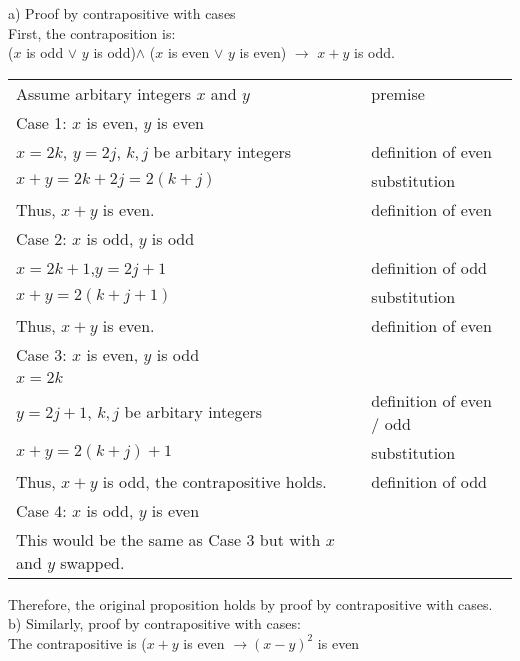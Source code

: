 \documentclass[12pt]{exam}
\begin{document}
\begin{solution}
  a) Proof by contrapositive with cases\\
  First, the contraposition is:\\
  ($x$ is odd $\lor$ $y$ is odd)$\land$ ($x$ is even $\lor$ $y$ is even) $\rightarrow$ $x+y$ is odd.\\
\begin{tabular}{ll}
  Assume arbitary integers $x$ and $y$ & premise\\
  Case 1: $x$ is even, $y$ is even\\
  $x=2k$, $y=2j$, $k,j$ be arbitary integers &definition of even\\
  $x+y=2k+2j=2(k+j)$ & substitution\\
  Thus, $x+y$ is even. & definition of even\\
  Case 2: $x$ is odd, $y$ is odd\\
  $x=2k+1$,$y=2j+1$ & definition of odd\\
  $x+y=2(k+j+1)$ & substitution\\
  Thus, $x+y$ is even. & definition of even\\
  Case 3: $x$ is even, $y$ is odd\\
  $x=2k$\\
  $y=2j+1$, $k,j$ be arbitary integers &definition of even / odd\\
  $x+y=2(k+j)+1$ &substitution\\
  Thus, $x+y$ is odd, the contrapositive holds. & definition of odd\\
  Case 4: $x$ is odd, $y$ is even\\
  This would be the same as Case 3 but with $x$ and $y$ swapped.\\
\end{tabular}
  Therefore, the original proposition holds by proof by contrapositive with cases.\\
  b) Similarly, proof by contrapositive with cases:\\
  The contrapositive is ($x+y$ is even $\rightarrow (x-y)^2$ is even\\


\end{solution}
\end{document}
